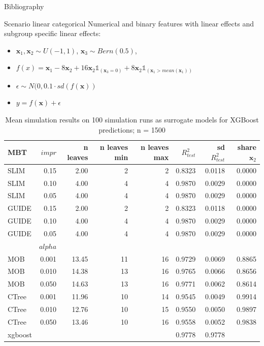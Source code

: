 \documentclass[9pt, xcolor=table]{beamer}
\begin{document}
\begin{frame}{Bibliography}


\end{frame}


\begin{frame}{Scenario linear categorical}
 Numerical and binary features with linear effects and subgroup specific linear effects:
\begin{itemize}
    \item $\textbf{x}_1, \textbf{x}_2 \sim U(-1,1)$, $\textbf{x}_3 \sim Bern(0.5)$,  
    \item $ f(x) =  \textbf{x}_{1} - 8  \textbf{x}_2 + 16  \textbf{x}_2  \mathbb{1}_{(\textbf{x}_3 = 0)} + 8  \textbf{x}_2  \mathbb{1}_{(\textbf{x}_1 > mean(\textbf{x}_1))} $
    \item $\epsilon \sim N(0, 0.1 \cdot sd(f(\textbf{x}))$
    \item $y = f(\textbf{x}) + \epsilon$          
\end{itemize}   


\begin{table}
\centering \scriptsize
\begin{tabular}[t]{l|r|r|r|r|r|r|r}
\hline
MBT & $impr$ & n leaves & n leaves min & n leaves max & $R^2_{test}$ & sd $R^2_{test}$ & share $\textbf{x}_2$\\

\hline
SLIM & 0.15 & 2.00 & 2 & 2 & 0.8323 & 0.0118 & 0.0000\\
SLIM & 0.10 & 4.00 & 4 & 4 & 0.9870 & 0.0029 & 0.0000\\
SLIM & 0.05 & 4.00 & 4 & 4 & 0.9870 & 0.0029 & 0.0000\\
GUIDE & 0.15 & 2.00 & 2 & 2 & 0.8323 & 0.0118 & 0.0000\\
GUIDE & 0.10 & 4.00 & 4 & 4 & 0.9870 & 0.0029 & 0.0000\\
GUIDE & 0.05 & 4.00 & 4 & 4 & 0.9870 & 0.0029 & 0.0000\\
\hline
& $alpha$ & & & & & & \\
\hline
MOB & 0.001 & 13.45 & 11 & 16 & 0.9729 & 0.0069 & 0.8865\\
MOB & 0.010 & 14.38 & 13 & 16 & 0.9765 & 0.0066 & 0.8656\\
MOB & 0.050 & 14.63 & 13 & 16 & 0.9771 & 0.0062 & 0.8614\\
CTree & 0.001 & 11.96 & 10 & 14 & 0.9545 & 0.0049 & 0.9914\\
CTree & 0.010 & 12.76 & 10 & 15 & 0.9550 & 0.0050 & 0.9897\\
CTree & 0.050 & 13.46 & 10 & 16 & 0.9558 & 0.0052 & 0.9838\\
\hline
xgboost &  &  &  &  & 0.9778 & 0.9778 & \\
\hline
\end{tabular}
\caption{Mean simulation results on 100 simulation runs as surrogate models for XGBoost predictions; n = 1500}
\end{table}
\end{frame}
\end{document}
